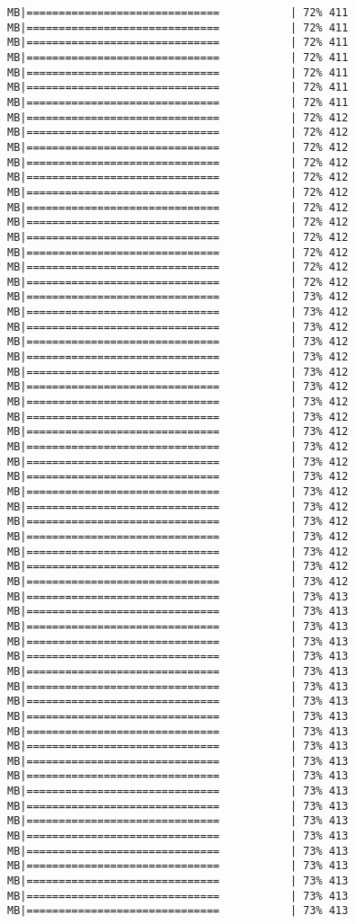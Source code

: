 \documentclass[
]{article}
\begin{document}
\begin{verbatim}
MB|==============================           | 72% 411 MB|==============================           | 72% 411 MB|==============================           | 72% 411 MB|==============================           | 72% 411 MB|==============================           | 72% 411 MB|==============================           | 72% 411 MB|==============================           | 72% 411 MB|==============================           | 72% 412 MB|==============================           | 72% 412 MB|==============================           | 72% 412 MB|==============================           | 72% 412 MB|==============================           | 72% 412 MB|==============================           | 72% 412 MB|==============================           | 72% 412 MB|==============================           | 72% 412 MB|==============================           | 72% 412 MB|==============================           | 72% 412 MB|==============================           | 72% 412 MB|==============================           | 72% 412 MB|==============================           | 73% 412 MB|==============================           | 73% 412 MB|==============================           | 73% 412 MB|==============================           | 73% 412 MB|==============================           | 73% 412 MB|==============================           | 73% 412 MB|==============================           | 73% 412 MB|==============================           | 73% 412 MB|==============================           | 73% 412 MB|==============================           | 73% 412 MB|==============================           | 73% 412 MB|==============================           | 73% 412 MB|==============================           | 73% 412 MB|==============================           | 73% 412 MB|==============================           | 73% 412 MB|==============================           | 73% 412 MB|==============================           | 73% 412 MB|==============================           | 73% 412 MB|==============================           | 73% 412 MB|==============================           | 73% 412 MB|==============================           | 73% 413 MB|==============================           | 73% 413 MB|==============================           | 73% 413 MB|==============================           | 73% 413 MB|==============================           | 73% 413 MB|==============================           | 73% 413 MB|==============================           | 73% 413 MB|==============================           | 73% 413 MB|==============================           | 73% 413 MB|==============================           | 73% 413 MB|==============================           | 73% 413 MB|==============================           | 73% 413 MB|==============================           | 73% 413 MB|==============================           | 73% 413 MB|==============================           | 73% 413 MB|==============================           | 73% 413 MB|==============================           | 73% 413 MB|==============================           | 73% 413 MB|==============================           | 73% 413 MB|==============================           | 73% 413 MB|==============================           | 73% 413 MB|==============================           | 73% 413 
\end{verbatim}
\end{document}
